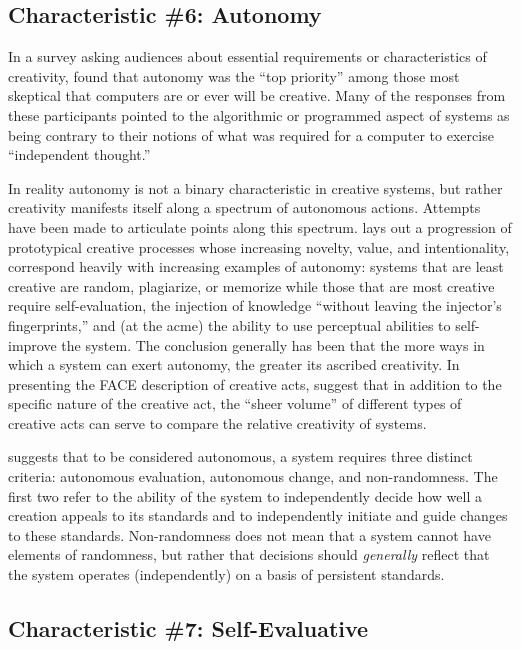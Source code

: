 \documentclass[phd,electronic,oneside,twosidetoc,letterpaper,chaptercenter,parttop,lol,lof,lot]{byumsphd}
\begin{document}
\subsection{Characteristic \#6: Autonomy}

In a survey asking audiences about essential requirements or characteristics of creativity, \cite{mumford2015man} found that autonomy was the ``top priority'' among those most skeptical that computers are or ever will be creative. Many of the responses from these participants pointed to the algorithmic or programmed aspect of systems as being contrary to their notions of what was required for a computer to exercise ``independent thought.''

In reality autonomy is not a binary characteristic in creative systems, but rather creativity manifests itself along a spectrum of autonomous actions. Attempts have been made to articulate points along this spectrum. \cite{Ventura2016} lays out a progression of prototypical creative processes whose increasing novelty, value, and intentionality, correspond heavily with increasing examples of autonomy: systems that are least creative are random, plagiarize, or memorize while those that are most creative require self-evaluation, the injection of knowledge ``without leaving the injector's fingerprints,'' and (at the acme) the ability to use perceptual abilities to self-improve the system. The conclusion generally has been that the more ways in which a system can exert autonomy, the greater its ascribed creativity. In presenting the FACE description of creative acts, \cite{Colton2011} suggest that in addition to the specific nature of the creative act, the ``sheer volume'' of different types of creative acts can serve to compare the relative creativity of systems.

\cite{Jennings2010DevelopingIntelligence} suggests that to be considered autonomous, a system requires three distinct criteria: autonomous evaluation, autonomous change, and non-randomness. The first two refer to the ability of the system to independently decide how well a creation appeals to its standards and to independently initiate and guide changes to these standards. Non-randomness does not mean that a system cannot have elements of randomness, but rather that decisions should \textit{generally} reflect that the system operates (independently) on a basis of persistent standards.

\subsection{Characteristic \#7: Self-Evaluative}
\end{document}
